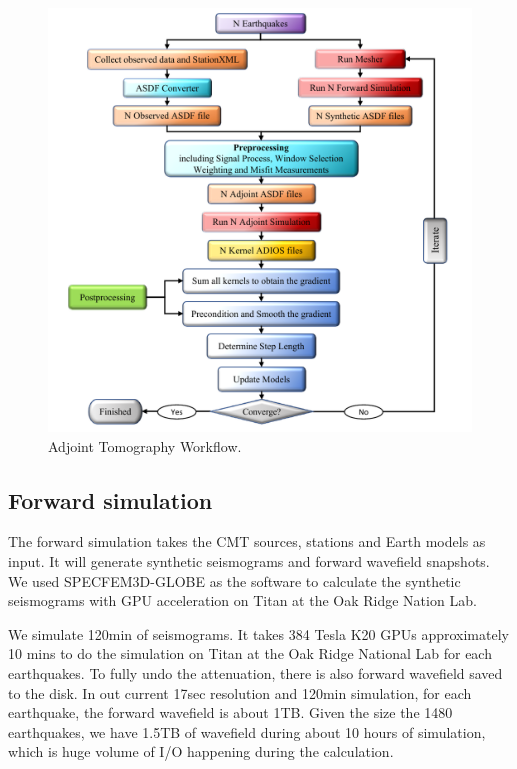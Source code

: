 \documentclass[extra,mreferee]{gji}
\begin{document}
\begin{figure}
  \centering
  \includegraphics[width=\textwidth]{figures/adjoint_workflow.pdf}
  \caption{Adjoint Tomography Workflow.}
  \label{fig:phase_hist}
\end{figure}

\subsection{Forward simulation}
The forward simulation takes the CMT sources, stations and Earth models as input. It will generate synthetic seismograms and forward wavefield snapshots. We used SPECFEM3D-GLOBE as the software to calculate the synthetic seismograms with GPU acceleration on Titan at the Oak Ridge Nation Lab.

We simulate 120min of seismograms. It takes 384 Tesla K20 GPUs approximately 10 mins to do the simulation on Titan at the Oak Ridge National Lab for each earthquakes. To fully undo the attenuation, there is also forward wavefield saved to the disk. In out current 17sec resolution and 120min simulation, for each earthquake, the forward wavefield is about 1TB. Given the size the 1480 earthquakes, we have 1.5TB of wavefield during about 10 hours of simulation, which is huge volume of I/O happening during the calculation.
\end{document}
